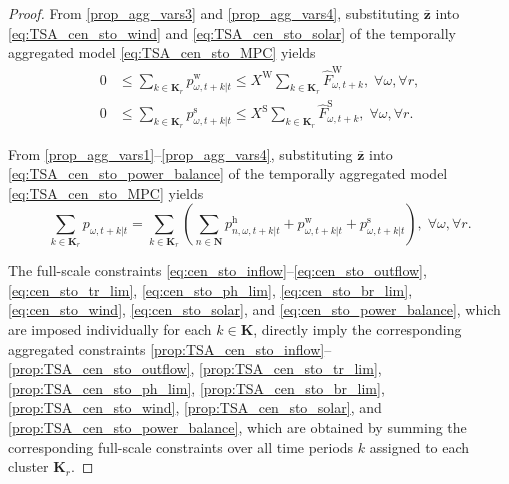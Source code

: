 \documentclass[a4paper,fleqn]{cas-sc}
\begin{document}
\begin{proof}
From \eqref{prop_agg_vars3} and \eqref{prop_agg_vars4},
substituting $\boldsymbol{\bar{z}}$ into
\eqref{eq:TSA_cen_sto_wind} and \eqref{eq:TSA_cen_sto_solar}
of the temporally aggregated model \eqref{eq:TSA_cen_sto_MPC} yields
\begin{align}
0 & \leq
\sum_{k \in \boldsymbol{K}_r} p^{\mathrm{w}}_{\omega, t+k|t}
\leq X^{\mathrm{W}} \sum_{k \in \boldsymbol{K}_r} \hat{F}^{\mathrm{W}}_{\omega, t+k},
\; \forall \omega, \forall r,
\label{prop:TSA_cen_sto_wind}\\
0 & \leq
\sum_{k \in \boldsymbol{K}_r} p^{\mathrm{s}}_{\omega, t+k|t}
\leq X^{\mathrm{S}} \sum_{k \in \boldsymbol{K}_r} \hat{F}^{\mathrm{S}}_{\omega, t+k},
\; \forall \omega, \forall r.
\label{prop:TSA_cen_sto_solar}
\end{align}

From \eqref{prop_agg_vars1}--\eqref{prop_agg_vars4},
substituting $\boldsymbol{\bar{z}}$ into
\eqref{eq:TSA_cen_sto_power_balance}
of the temporally aggregated model \eqref{eq:TSA_cen_sto_MPC} yields
\begin{equation}
\sum_{k \in \boldsymbol{K}_r} p_{\omega, t+k|t}
=
\sum_{k \in \boldsymbol{K}_r} \left(
\sum_{n \in \boldsymbol{N}} p^{\mathrm{h}}_{n, \omega, t+k|t} + p^{\mathrm{w}}_{\omega, t+k|t} + p^{\mathrm{s}}_{\omega, t+k|t}
\right), \; \forall \omega, \forall r.
\label{prop:TSA_cen_sto_power_balance}
\end{equation}

The full-scale constraints
\eqref{eq:cen_sto_inflow}--\eqref{eq:cen_sto_outflow},
\eqref{eq:cen_sto_tr_lim}, \eqref{eq:cen_sto_ph_lim}, \eqref{eq:cen_sto_br_lim},
\eqref{eq:cen_sto_wind}, \eqref{eq:cen_sto_solar}, and \eqref{eq:cen_sto_power_balance},
which are imposed individually for each $k \in \boldsymbol{K}$,
directly imply the corresponding aggregated constraints
\eqref{prop:TSA_cen_sto_inflow}--\eqref{prop:TSA_cen_sto_outflow},
\eqref{prop:TSA_cen_sto_tr_lim}, \eqref{prop:TSA_cen_sto_ph_lim}, \eqref{prop:TSA_cen_sto_br_lim},
\eqref{prop:TSA_cen_sto_wind}, \eqref{prop:TSA_cen_sto_solar}, and \eqref{prop:TSA_cen_sto_power_balance},
which are obtained by summing the corresponding full-scale constraints over all time periods $k$ assigned to each cluster $\boldsymbol{K}_r$.


\end{proof}
\end{document}
